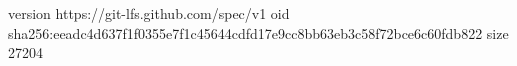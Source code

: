 version https://git-lfs.github.com/spec/v1
oid sha256:eeadc4d637f1f0355e7f1c45644cdfd17e9cc8bb63eb3c58f72bce6c60fdb822
size 27204
